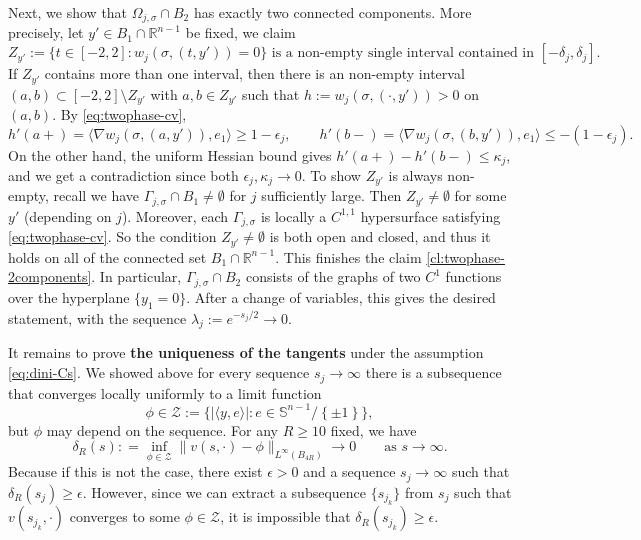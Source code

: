 \documentclass[11pt]{article}
\numberwithin{equation}{section}
\theoremstyle{definition}
\begin{document}
Next, we show that $\Omega_{j,\sigma} \cap B_2$ has exactly two connected components. More precisely, let $y' \in B_1 \cap \mathbb{R}^{n-1}$ be fixed, we claim
\begin{equation}\label{cl:twophase-2components}
    Z_{y'}:= \{t \in [-2,2]: w_j(\sigma, (t,y'))=0 \} \text{ is a non-empty single interval contained in } [-\delta_j, \delta_j]. 
\end{equation} 
If $Z_{y'}$ contains more than one interval, then there is an non-empty interval $(a,b) \subset [-2,2] \setminus Z_{y'} $ with $a, b \in Z_{y'} $ such that $h:= w_j(\sigma, (\cdot ,y')) >0 $ on $(a,b)$. By \eqref{eq:twophase-cv}, 
\[ h'(a+) = \langle \nabla w_j(\sigma, (a,y')), e_1 \rangle \geq 1-\epsilon_j, \qquad h'(b-) = \langle \nabla w_j(\sigma, (b,y')), e_1 \rangle  \leq -( 1-\epsilon_j).  \] 
On the other hand, the uniform Hessian bound gives $h'(a+) - h'(b-) \leq \kappa_j$, and we get a contradiction since both $\epsilon_j, \kappa_j \to 0$.
To show $Z_{y'}$ is always non-empty, recall we have $\Gamma_{j,\sigma} \cap B_1 \neq \emptyset$ for $j$ sufficiently large. Then $Z_{y'} \neq \emptyset$ for some $y'$ (depending on $j$). Moreover, each $\Gamma_{j,\sigma}$ is locally a $C^{1,1}$ hypersurface satisfying \eqref{eq:twophase-cv}. So the condition $Z_{y'} \neq \emptyset$ is both open and closed, and thus it holds on all of the connected set $B_1 \cap \mathbb{R}^{n-1}$. 
This finishes the claim \eqref{cl:twophase-2components}. In particular, $\Gamma_{j,\sigma}\cap B_2$ consists of the graphs of two $C^1$ functions over the hyperplane $\{y_1=0\}$. After a change of variables, this gives the desired statement, with the sequence $\lambda_j:= e^{-s_j/2} \to 0$. 


It remains to prove {\bf the uniqueness of the tangents} under the assumption \eqref{eq:dini-Cs}. 
We showed above for every sequence $s_j \to \infty$ there is a subsequence that converges locally uniformly to a limit function
\[
    \phi \in \mathcal Z:=\{|\langle y,e\rangle|:e\in\mathbb S^{n-1} / \left\lbrace\pm 1\right\rbrace\},
\]
but $\phi$ may depend on the sequence. 
For any $R\geq 10$ fixed, we have
\begin{equation}\label{eq:Z-trapping-simple}
    \delta_R(s):%
    = \inf_{\phi\in \mathcal{Z} } \|v(s,\cdot) - \phi\|_{L^\infty(B_{4R})} \to 0
    \qquad\text{as } s\to\infty.
\end{equation}
Because if this is not the case, there exist $\epsilon>0$ and a sequence $s_j \to \infty$ such that $\delta_R(s_j) \geq \epsilon$. However, since we can extract a subsequence $\{s_{j_k}\}$ from $s_j$ such that $v(s_{j_k},\cdot)$ converges to some $\phi \in \mathcal{Z}$, it is impossible that $\delta_R(s_{j_k}) \geq \epsilon$.
\end{document}
